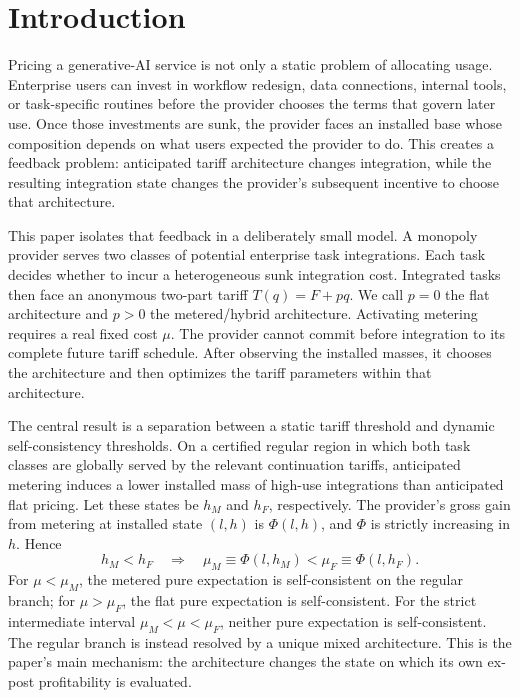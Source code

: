 \section{Introduction}\label{sec:introduction}

Pricing a generative-AI service is not only a static problem of allocating usage. Enterprise users can invest in workflow redesign, data connections, internal tools, or task-specific routines before the provider chooses the terms that govern later use. Once those investments are sunk, the provider faces an installed base whose composition depends on what users expected the provider to do. This creates a feedback problem: anticipated tariff architecture changes integration, while the resulting integration state changes the provider's subsequent incentive to choose that architecture.

This paper isolates that feedback in a deliberately small model. A monopoly provider serves two classes of potential enterprise task integrations. Each task decides whether to incur a heterogeneous sunk integration cost. Integrated tasks then face an anonymous two-part tariff $T(q)=F+pq$. We call $p=0$ the flat architecture and $p>0$ the metered/hybrid architecture. Activating metering requires a real fixed cost $\mu$. The provider cannot commit before integration to its complete future tariff schedule. After observing the installed masses, it chooses the architecture and then optimizes the tariff parameters within that architecture.

The central result is a separation between a static tariff threshold and dynamic self-consistency thresholds. On a certified regular region in which both task classes are globally served by the relevant continuation tariffs, anticipated metering induces a lower installed mass of high-use integrations than anticipated flat pricing. Let these states be $h_M$ and $h_F$, respectively. The provider's gross gain from metering at installed state $(l,h)$ is $\Phi(l,h)$, and $\Phi$ is strictly increasing in $h$. Hence
\[
 h_M<h_F \quad\Longrightarrow\quad \mu_M\equiv\Phi(l,h_M)<\mu_F\equiv\Phi(l,h_F).
\]
For $\mu<\mu_M$, the metered pure expectation is self-consistent on the regular branch; for $\mu>\mu_F$, the flat pure expectation is self-consistent. For the strict intermediate interval $\mu_M<\mu<\mu_F$, neither pure expectation is self-consistent. The regular branch is instead resolved by a unique mixed architecture. This is the paper's main mechanism: the architecture changes the state on which its own ex-post profitability is evaluated.

